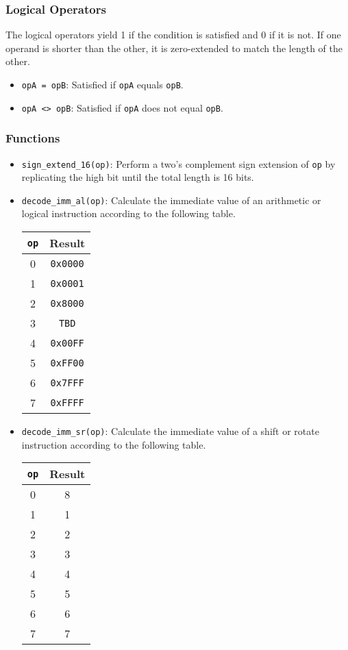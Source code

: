 \documentclass[12pt,a4paper]{article}
\begin{document}
\subsubsection{Logical Operators}
The logical operators yield 1 if the condition is satisfied and 0 if it is not. If one operand is shorter than the other, it is zero-extended to match the length of the other.

\begin{itemize}
  \item \texttt{opA = opB}: Satisfied if \texttt{opA} equals \texttt{opB}.
  \item \texttt{opA <> opB}: Satisfied if \texttt{opA} does not equal \texttt{opB}.
\end{itemize}

\subsubsection{Functions}

\begin{itemize}
  \item \texttt{sign\_extend\_16(op)}: Perform a two's complement sign extension of \texttt{op} by replicating the high bit until the total length is 16 bits.
  \item \texttt{decode\_imm\_al(op)}: Calculate the immediate value of an arithmetic or logical instruction according to the following table.\linebreak
    \begin{tabular}{|c c|}
    \hline
    \texttt{op} & Result \\
    \hline
    0 & \texttt{0x0000} \\
    1 & \texttt{0x0001} \\
    2 & \texttt{0x8000} \\
    3 & \texttt{TBD} \\
    4 & \texttt{0x00FF} \\
    5 & \texttt{0xFF00} \\
    6 & \texttt{0x7FFF} \\
    7 & \texttt{0xFFFF} \\
    \hline
    \end{tabular}
  \item \texttt{decode\_imm\_sr(op)}: Calculate the immediate value of a shift or rotate instruction according to the following table.\linebreak
    \begin{tabular}{|c c|}
    \hline
    \texttt{op} & Result \\
    \hline
    0 & 8 \\
    1 & 1 \\
    2 & 2 \\
    3 & 3 \\
    4 & 4 \\
    5 & 5 \\
    6 & 6 \\
    7 & 7 \\
    \hline
    \end{tabular}
\end{itemize}
\end{document}

